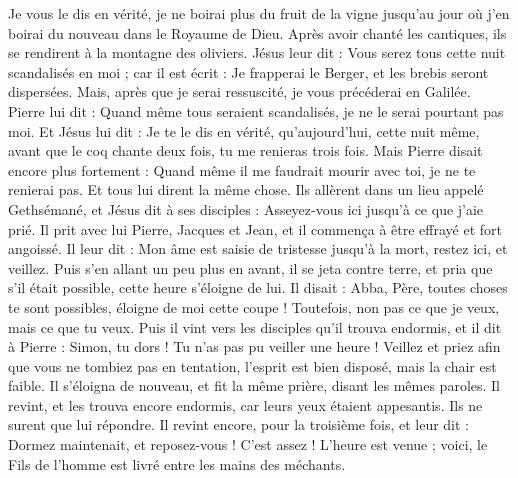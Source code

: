 \begin{multicols}{2}
Je vous le dis en vérité, je ne boirai plus du fruit de la vigne jusqu'au jour où j’en boirai du nouveau dans le Royaume de Dieu.
Après avoir chanté les cantiques{}, ils se rendirent à la montagne des oliviers.
Jésus leur dit : Vous serez tous cette nuit scandalisés en moi ; car il est écrit : Je frapperai le Berger, et les brebis seront dispersées{}.
Mais, après que je serai ressuscité, je vous précéderai en Galilée.
Pierre lui dit : Quand même tous seraient scandalisés, je ne le serai pourtant pas moi.
Et Jésus lui dit : Je te le dis en vérité, qu'aujourd'hui, cette nuit même, avant que le coq chante deux fois, tu me renieras trois fois.
Mais Pierre disait encore plus fortement : Quand même il me faudrait mourir avec toi, je ne te renierai pas. Et tous lui dirent la même chose.
Ils allèrent dans un lieu appelé Gethsémané, et Jésus dit à ses disciples : Asseyez-vous ici jusqu'à ce que j’aie prié.
Il prit avec lui Pierre, Jacques et Jean, et il commença à être effrayé et fort angoissé.
Il leur dit : Mon âme est saisie de tristesse jusqu’à la mort, restez ici, et veillez.
Puis s'en allant un peu plus en avant, il se jeta contre terre, et pria que s'il était possible, cette heure s’éloigne de lui.
Il disait : Abba, Père, toutes choses te sont possibles, éloigne de moi cette coupe ! Toutefois, non pas ce que je veux, mais ce que tu veux.
Puis il vint vers les disciples qu’il trouva endormis, et il dit à Pierre : Simon, tu dors ! Tu n’as pas pu veiller une heure !
Veillez et priez afin que vous ne tombiez pas en tentation, l'esprit est bien disposé, mais la chair est faible.
Il s’éloigna de nouveau, et fit la même prière, disant les mêmes paroles.
Il revint, et les trouva encore endormis, car leurs yeux étaient appesantis. Ils ne surent que lui répondre.
Il revint encore, pour la troisième fois, et leur dit : Dormez maintenait, et reposez-vous ! C’est assez ! L’heure est venue ; voici, le Fils de l'homme est livré entre les mains des méchants.

\end{multicols}
